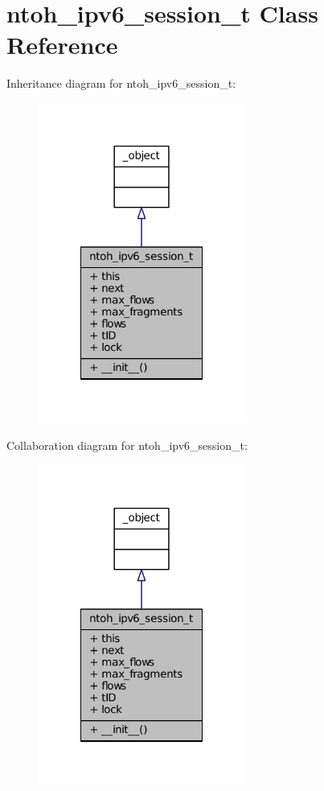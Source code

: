 \hypertarget{classlibntoh_1_1ntoh__ipv6__session__t}{\section{ntoh\-\_\-ipv6\-\_\-session\-\_\-t Class Reference}
\label{classlibntoh_1_1ntoh__ipv6__session__t}
}


Inheritance diagram for ntoh\-\_\-ipv6\-\_\-session\-\_\-t\-:
\nopagebreak
\begin{figure}[H]
\begin{center}
\leavevmode
\includegraphics[width=192pt]{classlibntoh_1_1ntoh__ipv6__session__t__inherit__graph}
\end{center}
\end{figure}


Collaboration diagram for ntoh\-\_\-ipv6\-\_\-session\-\_\-t\-:
\nopagebreak
\begin{figure}[H]
\begin{center}
\leavevmode
\includegraphics[width=192pt]{classlibntoh_1_1ntoh__ipv6__session__t__coll__graph}
\end{center}
\end{figure}

